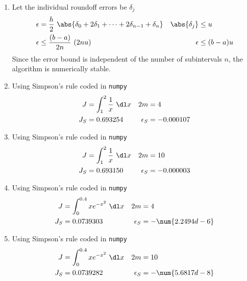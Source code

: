 \begin{enumerate}
    \item Let the individual roundoff errors be $ \delta_j $
          \begin{align}
              \epsilon       & = \frac{h}{2}\ \abs{\delta_0 + 2\delta_1
                  + \dots + 2\delta_{n-1} + \delta_n}
                             &
              \abs{\delta_j} & \leq u                                     \\
              \epsilon       & \leq \frac{(b-a)}{2n}\ (2nu)             &
              \epsilon       & \leq (b-a)u
          \end{align}
          Since the error bound is independent of the number of subintervals $ n $, the
          algorithm is numerically stable.

    \item Using Simpson's rule coded in \texttt{numpy}
          \begin{align}
              J          & = \int_{1}^{2} \frac{1}{x}\ \dl x &
              2m         & = 4                                 \\
              J_S        & = 0.693254                        &
              \epsilon_S & = -0.000107
          \end{align}

    \item Using Simpson's rule coded in \texttt{numpy}
          \begin{align}
              J          & = \int_{1}^{2} \frac{1}{x}\ \dl x &
              2m         & = 10                                \\
              J_S        & = 0.693150                        &
              \epsilon_S & = -0.000003
          \end{align}

    \item Using Simpson's rule coded in \texttt{numpy}
          \begin{align}
              J          & = \int_{0}^{0.4} xe^{-x^2}\ \dl x &
              2m         & = 4                                 \\
              J_S        & = 0.0739303                       &
              \epsilon_S & = -\num{2.2494d-6}
          \end{align}

    \item Using Simpson's rule coded in \texttt{numpy}
          \begin{align}
              J          & = \int_{0}^{0.4} xe^{-x^2}\ \dl x &
              2m         & = 10                                \\
              J_S        & = 0.0739282                       &
              \epsilon_S & = -\num{5.6817d-8}
          \end{align}


\end{enumerate}
